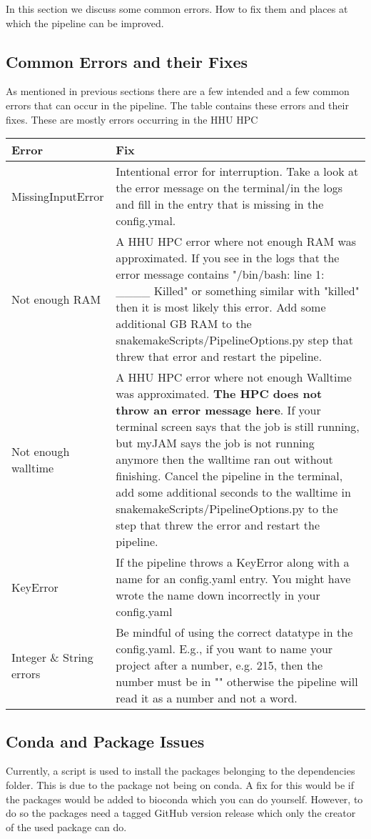 In this section we discuss some common errors. How to fix them and places at which the pipeline can be improved.

\subsection{Common Errors and their Fixes}
As mentioned in previous sections there are a few intended and a few common errors that can occur in the pipeline. The table contains these errors and their fixes. These are mostly errors occurring in the HHU HPC

\begin{tabular}{p{3.5cm} | p{10cm}}
	Error & Fix\\
	\hline
	MissingInputError & Intentional error for interruption. Take a look at the error message on the terminal/in the logs and fill in the entry that is missing in the config.ymal.\\
	Not enough RAM & A HHU HPC error where not enough RAM was approximated. If you see in the logs that the error message contains "/bin/bash: line 1: \_\_\_\_ Killed" or something similar with "killed" then it is most likely this error. Add some additional GB RAM to the snakemakeScripts/PipelineOptions.py step that threw that error and restart the pipeline.\\
	Not enough walltime & A HHU HPC error where not enough Walltime was approximated. \textbf{The HPC does not throw an error message here}. If your terminal screen says that the job is still running, but myJAM says the job is not running anymore then the walltime ran out without finishing. Cancel the pipeline in the terminal, add some additional seconds to the walltime in snakemakeScripts/PipelineOptions.py to the step that threw the error and restart the pipeline.\\
	KeyError & If the pipeline throws a KeyError along with a name for an config.yaml entry. You might have wrote the name down incorrectly in your config.yaml\\
	Integer \& String errors & Be mindful of using the correct datatype in the config.yaml. E.g., if you want to name your project after a number, e.g. 215, then the number must be in "" otherwise the pipeline will read it as a number and not a word.
\end{tabular}

\subsection{Conda and Package Issues}
Currently, a script is used to install the packages belonging to the dependencies folder. This is due to the package not being on conda. A fix for this would be if the packages would be added to bioconda which you can do yourself. However, to do so the packages need a tagged GitHub version release which only the creator of the used package can do.

